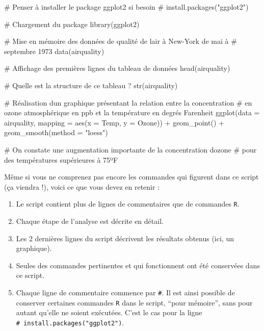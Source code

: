 \documentclass[
  a4paper,
  DIV=11,
  numbers=noendperiod,
  oneside]{scrreprt}
\newenvironment{Shaded}{}{}
\newcommand{\AttributeTok}[1]{\textcolor[rgb]{0.84,0.23,0.29}{#1}}
\newcommand{\CommentTok}[1]{\textcolor[rgb]{0.42,0.45,0.49}{#1}}
\newcommand{\FunctionTok}[1]{\textcolor[rgb]{0.44,0.26,0.76}{#1}}
\newcommand{\NormalTok}[1]{\textcolor[rgb]{0.14,0.16,0.18}{#1}}
\newcommand{\SpecialCharTok}[1]{\textcolor[rgb]{0.00,0.36,0.77}{#1}}
\newcommand{\StringTok}[1]{\textcolor[rgb]{0.01,0.18,0.38}{#1}}
\providecommand{\tightlist}{%
  \setlength{\itemsep}{0pt}\setlength{\parskip}{0pt}}\usepackage{longtable,booktabs,array}
\begin{document}
\begin{Shaded}
\begin{Highlighting}[]
\CommentTok{\# Penser à installer le package ggplot2 si besoin}
\CommentTok{\# install.packages("ggplot2")}

\CommentTok{\# Chargement du package}
\FunctionTok{library}\NormalTok{(ggplot2)}

\CommentTok{\# Mise en mémoire des données de qualité de l\textquotesingle{}air à New{-}York de mai à}
\CommentTok{\# septembre 1973}
\FunctionTok{data}\NormalTok{(airquality)}

\CommentTok{\# Affichage des premières lignes du tableau de données}
\FunctionTok{head}\NormalTok{(airquality)}

\CommentTok{\# Quelle est la structure de ce tableau ?}
\FunctionTok{str}\NormalTok{(airquality)}

\CommentTok{\# Réalisation d\textquotesingle{}un graphique présentant la relation entre la concentration}
\CommentTok{\# en ozone atmosphérique en ppb et la température en degrés Farenheit}
\FunctionTok{ggplot}\NormalTok{(}\AttributeTok{data =}\NormalTok{ airquality, }\AttributeTok{mapping =} \FunctionTok{aes}\NormalTok{(}\AttributeTok{x =}\NormalTok{ Temp, }\AttributeTok{y =}\NormalTok{ Ozone)) }\SpecialCharTok{+}
  \FunctionTok{geom\_point}\NormalTok{() }\SpecialCharTok{+}
  \FunctionTok{geom\_smooth}\NormalTok{(}\AttributeTok{method =} \StringTok{"loess"}\NormalTok{)}

\CommentTok{\# On constate une augmentation importante de la concentration d\textquotesingle{}ozone }
\CommentTok{\# pour des températures supérieures à 75ºF}
\end{Highlighting}
\end{Shaded}

Même si vous ne comprenez pas encore les commandes qui figurent dans ce
script (ça viendra !), voici ce que vous devez en retenir :

\begin{enumerate}
\def\labelenumi{\arabic{enumi}.}
\tightlist
\item
  Le script contient plus de lignes de commentaires que de commandes
  \texttt{R}.
\item
  Chaque étape de l'analyse est décrite en détail.
\item
  Les 2 dernières lignes du script décrivent les résultats obtenus (ici,
  un graphique).
\item
  Seules des commandes pertinentes et qui fonctionnent ont été
  conservées dans ce script.
\item
  Chaque ligne de commentaire commence par \texttt{\#}. Il est ainsi
  possible de conserver certaines commandes \texttt{R} dans le script,
  ``pour mémoire'', sans pour autant qu'elle ne soient exécutées. C'est
  le cas pour la ligne \texttt{\#\ install.packages("ggplot2")}.
\end{enumerate}
\end{document}
